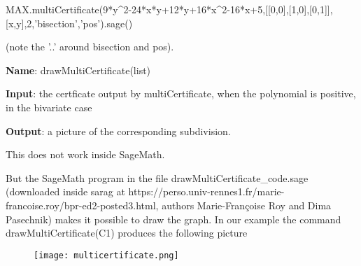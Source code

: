 \documentclass{article}
\begin{document}
MAX.multiCertificate(9*y\^{}2-24*x*y+12*y+16*x\^{}2-16*x+5,[[0,0],[1,0],[0,1]],[x,y],2,'bisection','pos').sage()

\noindent(note the '..' around bisection and pos).
  
\newpage
 {\bf Name}: drawMultiCertificate(list)
  
{\bf Input}: the certficate output by multiCertificate, when the polynomial is
  positive, in the bivariate case
  
 {\bf Output}: a picture of the corresponding subdivision.
 
  This does not work inside SageMath.

\noindent But the SageMath program in the file drawMultiCertificate\_code.sage (downloaded inside sarag
 at https://perso.univ-rennes1.fr/marie-francoise.roy/bpr-ed2-posted3.html, authors Marie-Fran\c coise Roy and Dima Pasechnik)  makes it possible to draw the graph. In our example the command  drawMultiCertificate(C1) produces the following picture
{\center
\begin{figure}[h!]
  \texttt{[image: multicertificate.png]}
\end{figure}
}
  
\noindent 
\end{document}

